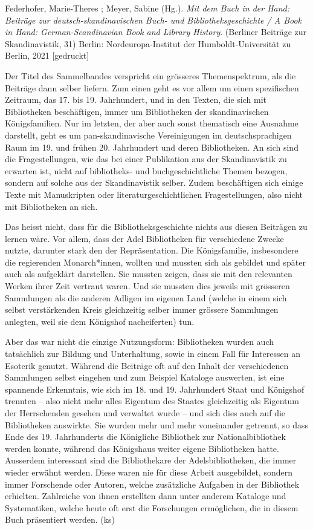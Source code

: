 \documentclass[a4paper,
fontsize=11pt,
oneside,
numbers=noperiodatend,
parskip=half-,
bibliography=totoc,
final
]{scrartcl}
\begin{document}
Federhofer, Marie-Theres ; Meyer, Sabine (Hg.). \emph{Mit dem Buch in
der Hand: Beiträge zur deutsch-skandinavischen Buch- und
Bibliotheksgeschichte / A Book in Hand: German-Scandinavian Book and
Library History}. (Berliner Beiträge zur Skandinavistik, 31) Berlin:
Nordeuropa-Institut der Humboldt-Universität zu Berlin, 2021
{[}gedruckt{]}

Der Titel des Sammelbandes verspricht ein grösseres Themenspektrum, als
die Beiträge dann selber liefern. Zum einen geht es vor allem um einen
spezifischen Zeitraum, das 17. bis 19. Jahrhundert, und in den Texten,
die sich mit Bibliotheken beschäftigen, immer um Bibliotheken der
skandinavischen Königsfamilien. Nur im letzten, der aber auch sonst
thematisch eine Ausnahme darstellt, geht es um pan-skandinavische
Vereinigungen im deutschsprachigen Raum im 19. und frühen 20.
Jahrhundert und deren Bibliotheken. An sich sind die Fragestellungen,
wie das bei einer Publikation aus der Skandinavistik zu erwarten ist,
nicht auf bibliotheks- und buchgeschichtliche Themen bezogen, sondern
auf solche aus der Skandinavistik selber. Zudem beschäftigen sich einige
Texte mit Manuskripten oder literaturgeschichtlichen Fragestellungen,
also nicht mit Bibliotheken an sich.

Das heisst nicht, dass für die Bibliotheksgeschichte nichts aus diesen
Beiträgen zu lernen wäre. Vor allem, dass der Adel Bibliotheken für
verschiedene Zwecke nutzte, darunter stark den der Repräsentation. Die
Königsfamilie, insbesondere die regierenden Monarch*innen, wollten und
mussten sich als gebildet und später auch als aufgeklärt darstellen. Sie
mussten zeigen, dass sie mit den relevanten Werken ihrer Zeit vertraut
waren. Und sie mussten dies jeweils mit grösseren Sammlungen als die
anderen Adligen im eigenen Land (welche in einem sich selbst
verstärkenden Kreis gleichzeitig selber immer grössere Sammlungen
anlegten, weil sie dem Königshof nacheiferten) tun.

Aber das war nicht die einzige Nutzungsform: Bibliotheken wurden auch
tatsächlich zur Bildung und Unterhaltung, sowie in einem Fall für
Interessen an Esoterik genutzt. Während die Beiträge oft auf den Inhalt
der verschiedenen Sammlungen selbst eingehen und zum Beispiel Kataloge
auswerten, ist eine spannende Erkenntnis, wie sich im 18. und 19.
Jahrhundert Staat und Königshof trennten -- also nicht mehr alles
Eigentum des Staates gleichzeitig als Eigentum der Herrschenden gesehen
und verwaltet wurde -- und sich dies auch auf die Bibliotheken
auswirkte. Sie wurden mehr und mehr voneinander getrennt, so dass Ende
des 19. Jahrhunderts die Königliche Bibliothek zur Nationalbibliothek
werden konnte, während das Königshaus weiter eigene Bibliotheken hatte.
Ausserdem interessant sind die Bibliothekare der Adelsbibliotheken, die
immer wieder erwähnt werden. Diese waren nie für diese Arbeit
ausgebildet, sondern immer Forschende oder Autoren, welche zusätzliche
Aufgaben in der Bibliothek erhielten. Zahlreiche von ihnen erstellten
dann unter anderem Kataloge und Systematiken, welche heute oft erst die
Forschungen ermöglichen, die in diesem Buch präsentiert werden. (ks)
\end{document}
